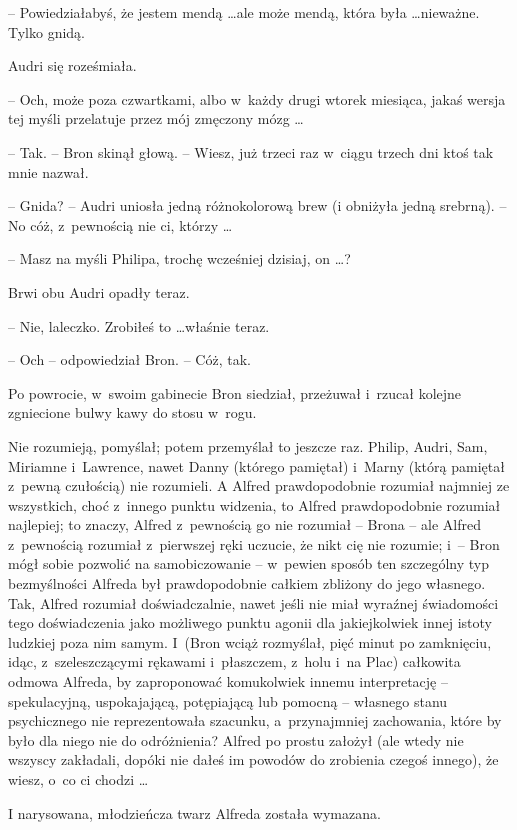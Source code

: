 \documentclass[oneside,polish,11pt,rmheadings]{mwbk}
\begin{document}
-- Powiedziałabyś, że jestem mendą \ldots  ale może mendą, która była \ldots  nieważne. Tylko gnidą. 

Audri się roześmiała. 

-- Och, może poza czwartkami, albo w~każdy drugi wtorek miesiąca, jakaś wersja tej myśli przelatuje przez mój zmęczony mózg \ldots   

-- Tak. -- Bron skinął głową. -- Wiesz, już trzeci raz w~ciągu trzech dni ktoś tak mnie nazwał. 

-- Gnida? -- Audri uniosła jedną różnokolorową brew (i obniżyła jedną srebrną). -- No cóż, z~pewnością nie ci, którzy  \ldots  

-- Masz na myśli Philipa, trochę wcześniej dzisiaj, on \ldots ? 

Brwi obu Audri opadły teraz. 

-- Nie, laleczko. Zrobiłeś to  \ldots  właśnie teraz. 

-- Och -- odpowiedział Bron. -- Cóż, tak. 

Po powrocie, w~swoim gabinecie Bron siedział, przeżuwał i~rzucał kolejne zgniecione bulwy kawy do stosu w~rogu. 

Nie rozumieją, pomyślał; potem przemyślał to jeszcze raz. Philip, Audri, Sam, Miriamne i~Lawrence, nawet Danny (którego pamiętał) i~Marny (którą pamiętał z~pewną czułością) nie rozumieli. A Alfred prawdopodobnie rozumiał najmniej ze wszystkich, choć z~innego punktu widzenia, to Alfred prawdopodobnie rozumiał najlepiej; to znaczy, Alfred z~pewnością go nie rozumiał -- Brona -- ale Alfred z~pewnością rozumiał z~pierwszej ręki uczucie, że nikt cię nie rozumie; i~-- Bron mógł sobie pozwolić na samobiczowanie -- w~pewien sposób ten szczególny typ bezmyślności Alfreda był prawdopodobnie całkiem zbliżony do jego własnego. Tak, Alfred rozumiał doświadczalnie, nawet jeśli nie miał wyraźnej świadomości tego doświadczenia jako możliwego punktu agonii dla jakiejkolwiek innej istoty ludzkiej poza nim samym. I~(Bron wciąż rozmyślał, pięć minut po zamknięciu, idąc, z~szeleszczącymi rękawami i~płaszczem, z~holu i~na Plac) całkowita odmowa Alfreda, by zaproponować komukolwiek innemu interpretację -- spekulacyjną, uspokajającą, potępiającą lub pomocną -- własnego stanu psychicznego nie reprezentowała szacunku, a~przynajmniej zachowania, które by było dla niego nie do odróżnienia? Alfred po prostu założył (ale wtedy nie wszyscy zakładali, dopóki nie dałeś im powodów do zrobienia czegoś innego), że wiesz, o~co ci chodzi \ldots  

I narysowana, młodzieńcza twarz Alfreda została wymazana. 
\end{document}
